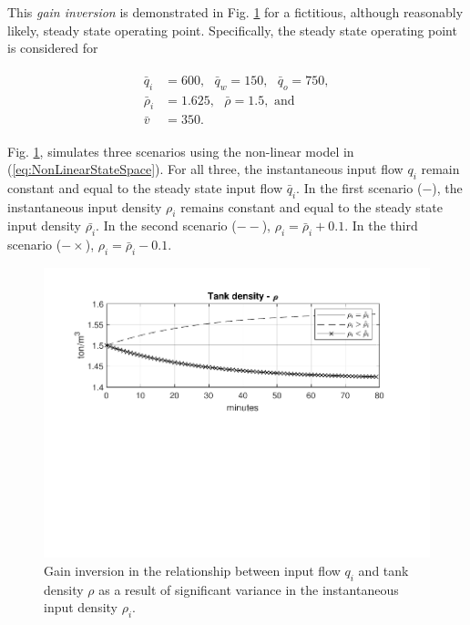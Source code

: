 \documentclass[preprint,authoryear,12pt]{elsarticle}
\begin{document}
This \emph{gain inversion} is demonstrated in Fig. \ref{fig:GainInversion} for a fictitious, although reasonably likely, steady state operating point. Specifically, the steady state operating point is considered for 

\begin{align}
	\begin{split}
		\bar{q}_i &= 600, \text{  }\bar{q}_w = 150, \text{  }\bar{q}_o = 750, \\
		\bar{\rho}_i &= 1.625, \text{  }\bar{\rho} = 1.5, \text{ and }\\
		\bar{v} &= 350.
	\end{split}
\label{eq:GainInversionSimValues}
\end{align}

Fig. \ref{fig:GainInversion}, simulates three scenarios using the non-linear model in (\ref{eq:NonLinearStateSpace}). For all three, the instantaneous input flow $q_i$ remain constant and equal to the steady state input flow $\bar{q}_i$. In the first scenario ($-$), the instantaneous input density $\rho_i$ remains constant and equal to the steady state input density $\bar{\rho_i}$. In the second scenario ($--$), $\rho_i = \bar{\rho}_i + 0.1$. In the third scenario ($-\times$), $\rho_i = \bar{\rho}_i - 0.1$.

\begin{figure}[t!]
	\centering
	\includegraphics[trim={0.8cm, 5cm, 0.8cm, 0.8cm}, clip, width=5.2in]{gain_inversion.pdf}
	\caption{Gain inversion in the relationship between input flow $q_i$ and tank density $\rho$ as a result of significant variance in the instantaneous input density $\rho_i$.}
	\label{fig:GainInversion}
\end{figure}
\end{document}
